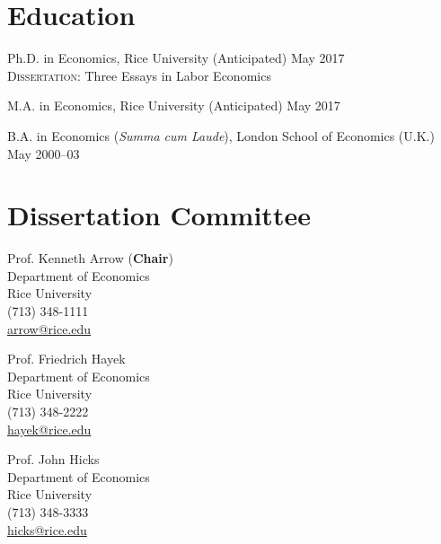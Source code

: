 \documentclass[11pt]{res} %
\newcommand{\forceindent}{\leavevmode{\parindent=24pt\indent}}
\begin{document}
\thispagestyle{empty}


\address{
\href{mailto:dricardo@rice.edu}{dricardo@rice.edu} \\
Department of Economics MS-22 \\
Rice University, Houston, TX 77251-1892\\
(713) 348-8411
}

\begin{resume}

\section{Education}
\vspace{6pt}

Ph.D. in Economics, Rice University  \hfill (Anticipated) May 2017  \\
\forceindent \textsc{Dissertation}: Three Essays in Labor Economics 

M.A. in Economics, Rice University  \hfill (Anticipated) May 2017 

B.A. in Economics (\emph{Summa cum Laude}), London School of Economics (U.K.)  \hfill    May 2000--03 

\section{Dissertation Committee}
\vspace{6pt}

\forceindent
\begin{minipage}[t]{0.5\textwidth}
Prof. Kenneth Arrow (\textbf{Chair}) \\
Department of Economics \\
Rice University \\
(713) 348-1111\\
\href{mailto:arrow@rice.edu}{arrow@rice.edu}

\vspace{.4cm}

Prof. Friedrich Hayek \\
Department of Economics \\
Rice University \\
(713) 348-2222\\
\href{mailto:hayek@rice.edu}{hayek@rice.edu}
\end{minipage}%
%
%
%
\begin{minipage}[t]{0.5\textwidth}
Prof. John Hicks \\
Department of Economics\\
Rice University \\
(713) 348-3333 \\
\href{mailto:hicks@rice.edu}{hicks@rice.edu}
\end{minipage}



\end{resume}
\end{document}
